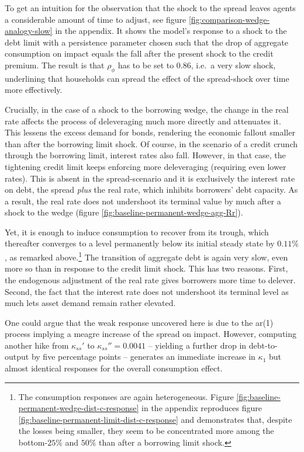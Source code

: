 \documentclass[a4paper,12pt]{article} %
\numberwithin{equation}{section} %
\numberwithin{figure}{section}
\numberwithin{table}{section}
\begin{document}
To get an intuition for the observation that the shock to the spread leaves agents a considerable amount of time to adjust, see figure \ref{fig:comparison-wedge-analogy-slow} in the appendix. It shows the model's response to a shock to the debt limit with a persistence parameter chosen such that the drop of aggregate consumption on impact equals the fall after the present shock to the credit premium. The result is that $\rho_{\phi}$ has to be set to $0.86$, i.e.~a very slow shock, underlining that households can spread the effect of the spread-shock over time more effectively.

Crucially, in the case of a shock to the borrowing wedge, the change in the real rate affects the process of deleveraging much more directly and attenuates it. This lessens the excess demand for bonds, rendering the economic fallout smaller than after the borrowing limit shock. Of course, in the scenario of a credit crunch through the borrowing limit, interest rates also fall. However, in that case, the tightening credit limit keeps enforcing more deleveraging (requiring even lower rates). This is absent in the spread-scenario and it is exclusively the interest rate on debt, the spread \textit{plus} the real rate, which inhibits borrowers' debt capacity. As a result, the real rate does not undershoot its terminal value by much after a shock to the wedge (figure \ref{fig:baseline-permanent-wedge-agg-Rr}). 

Yet, it is enough to induce consumption to recover from its trough, which thereafter converges to a level permanently below its initial steady state by $0.11\%$, as remarked above.\footnote{The consumption responses are again heterogeneous. Figure \ref{fig:baseline-permanent-wedge-dist-c-response} in the appendix reproduces figure \ref{fig:baseline-permanent-limit-dist-c-response} and demonstrates that, despite the losses being smaller, they seem to be concentrated more among the bottom-$25\%$ and $50\%$ than after a borrowing limit shock.} The transition of aggregate debt is again very slow, even more so than in response to the credit limit shock. This has two reasons. First, the endogenous adjustment of the real rate gives borrowers more time to delever. Second, the fact that the interest rate does not undershoot its terminal level as much lets asset demand remain rather elevated.

One could argue that the weak response uncovered here is due to the \Gls{ar}(1) process implying a meagre increase of the spread on impact. However, computing another hike from $\kappa_{ss}'$ to $\kappa_{ss}'' = 0.0041$ -- yielding a further drop in debt-to-output by five percentage points -- generates an immediate increase in $\kappa_1$ but almost identical responses for the overall consumption effect.
\end{document}
